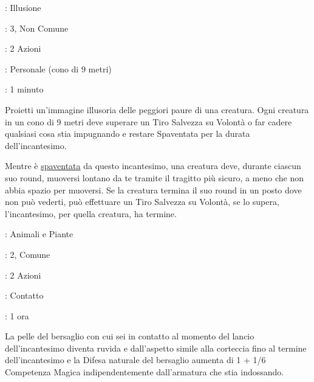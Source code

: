 \begin{multicols}{2}
\noindent\colorbox{OBSSgold!10}{
\begin{minipage}{0.95\linewidth}
\begin{description}[noitemsep, topsep=0pt, parsep=0pt, partopsep=0pt, leftmargin=0cm, labelwidth=1.3cm]
	\item[\textbf{Lista}]: Illusione
	\item[\textbf{Livello}]: 3, Non Comune
	\item[\textbf{Lancio}]: 2 Azioni
	\item[\textbf{Gittata}]: Personale (cono di 9 metri)
	\item[\textbf{Durata}]: 1 minuto
\end{description}
\end{minipage}}\smallskip

Proietti un'immagine illusoria delle peggiori paure di una creatura. Ogni creatura in un cono di 9 metri deve superare un Tiro Salvezza su Volontà o far cadere qualsiasi cosa stia impugnando e restare Spaventata per la durata dell'incantesimo.

Mentre è \hyperlink{condizionepaura}{spaventata} da questo incantesimo, una creatura deve, durante ciascun suo round, muoversi lontano da te tramite il tragitto più sicuro, a meno che non abbia spazio per muoversi. Se la creatura termina il suo round in un posto dove non può vederti, può effettuare un Tiro Salvezza su Volontà, se lo supera, l'incantesimo, per quella creatura, ha termine.

\noindent\colorbox{OBSSgold!10}{
\begin{minipage}{0.95\linewidth}
\begin{description}[noitemsep, topsep=0pt, parsep=0pt, partopsep=0pt, leftmargin=0cm, labelwidth=1.3cm]
	\item[\textbf{Lista}]: Animali e Piante
	\item[\textbf{Livello}]: 2, Comune
	\item[\textbf{Lancio}]: 2 Azioni
	\item[\textbf{Gittata}]: Contatto
	\item[\textbf{Durata}]: 1 ora
\end{description}
\end{minipage}}\smallskip

La pelle del bersaglio con cui sei in contatto al momento del lancio dell'incantesimo diventa ruvida e dall'aspetto simile alla corteccia fino al termine dell'incantesimo e la Difesa naturale del bersaglio aumenta di 1 + 1/6 Competenza Magica indipendentemente dall'armatura che stia indossando.


\end{multicols}
